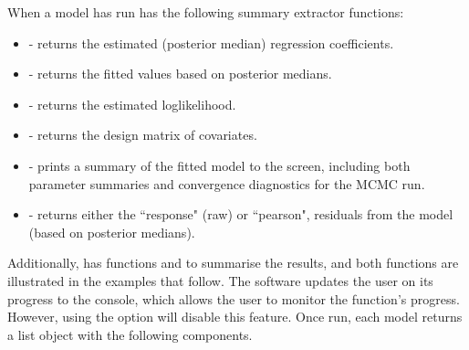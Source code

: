 \documentclass[article,shortnames,nojss]{jss}
\begin{document}
When a model has run  has the following summary extractor functions: 


\begin{itemize}
\item {} - returns the estimated (posterior median) regression coefficients. 
\item {} - returns the fitted values based on posterior medians.
\item {} - returns the estimated loglikelihood.
\item {} - returns the design matrix of covariates.
\item {} - prints a summary of the fitted model to the screen, including both parameter summaries and convergence diagnostics for the MCMC run.
\item {} - returns either the ``response" (raw) or ``pearson", residuals from the model (based on posterior medians).
\end{itemize}

Additionally,  has functions  and  to summarise the results, and both functions are illustrated in the examples that follow. The software updates the user on its progress to the  console, which allows the user to monitor the function's progress. However, using the  option will disable this feature. Once run, each model returns a list object with the following components. 
\end{document}
